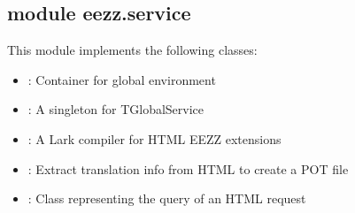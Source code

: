\documentclass[letterpaper,10pt,english]{sphinxmanual}
\begin{document}

\begin{savenotes}\begin{fulllineitems}
\label{\detokenize{eezz:eezz.server.shutdown_function}}
\pysigstartsignatures
{}
\pysigstopsignatures
\end{fulllineitems}\end{savenotes}



\subsection{module eezz.service}
\label{\detokenize{eezz:module-eezz.service}}\label{\detokenize{eezz:module-eezz-service}}
\sphinxAtStartPar
This module implements the following classes:
\begin{itemize}
\item {} 
\sphinxAtStartPar
{}: Container for global environment

\item {} 
\sphinxAtStartPar
{}: A singleton for TGlobalService

\item {} 
\sphinxAtStartPar
{}: A Lark compiler for HTML EEZZ extensions

\item {} 
\sphinxAtStartPar
{}: Extract translation info from HTML to create a POT file

\item {} 
\sphinxAtStartPar
{}: Class representing the query of an HTML request

\end{itemize}
\end{document}
